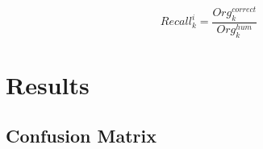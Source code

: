 \documentclass[12pt]{article}
\begin{document}
\begin{equation} \label{recall}
    Recall^{i}_{k}=\frac{Org^{correct}_{k}}{Org^{hum}_{k}}
\end{equation}


\section{Results}

\subsection{Confusion Matrix}



\singlespacing
\printbibliography
\end{document}
